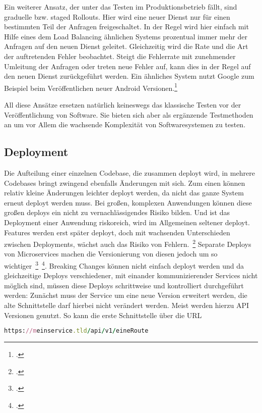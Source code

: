 Ein weiterer Ansatz, der unter das Testen im Produktionsbetrieb fällt, sind graduelle bzw. staged Rollouts. Hier wird eine neuer Dienst nur für einen bestimmten Teil der Anfragen freigeschaltet. In der Regel wird hier einfach mit Hilfe eines dem Load Balancing ähnlichen Systems prozentual immer mehr der Anfragen auf den neuen Dienst geleitet. Gleichzeitig wird die Rate und die Art der auftretenden Fehler beobachtet. Steigt die Fehlerrate mit zunehmender Umleitung der Anfragen oder treten neue Fehler auf, kann dies in der Regel auf den neuen Dienst zurückgeführt werden. Ein ähnliches System nutzt Google zum Beispiel beim Veröffentlichen neuer Android Versionen.\footcite[vgl.][]{Google:staged}

All diese Ansätze ersetzen natürlich keineswegs das klassische Testen vor der Veröffentlichung von Software. Sie bieten sich aber als ergänzende Testmethoden an um vor Allem die wachsende Komplexität von Softwaresystemen zu testen.

\subsection{Deployment}
Die Aufteilung einer einzelnen Codebase, die zusammen deployt wird, in mehrere Codebases bringt zwingend ebenfalls Änderungen mit sich.
Zum einen können relativ kleine Änderungen leichter deployt werden, da nicht das ganze System erneut deployt werden muss. Bei großen, komplexen Anwendungen können diese großen deploys ein nicht zu vernachlässigendes Risiko bilden. Und ist das Deployment einer Anwendung riskoreich, wird im Allgemeinen seltener deployt. Features werden erst später deployt, doch mit wachsenden Unterschieden zwischen Deployments, wächst auch das Risiko von Fehlern.~\footcite[vgl.][Seite 6]{newman2015building}
Separate Deploys von Microservices machen die Versionierung von diesen jedoch um so wichtiger~\footcite[vgl.][Seite 62]{newman2015building}~\footcite[vgl.][]{Vergleichsartikel}. Breaking Changes können nicht einfach deployt werden und da gleichzeitige Deploys verschiedener, mit einander kommunizierender Services nicht möglich sind, müssen diese Deploys schrittweise und kontrolliert durchgeführt werden: Zunächst muss der Service um eine neue Version erweitert werden, die alte Schnittstelle darf hierbei nicht verändert werden. Meist werden hierzu API Versionen genutzt. So kann die erste Schnittstelle über die URL

\begin{lstlisting}[language=Ruby]
https://meinservice.tld/api/v1/eineRoute
\end{lstlisting}


